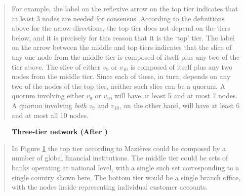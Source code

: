 \begin{center}
{{{{\begin{quote}
For example, the label on the reflexive arrow on the top tier indicates that at least 3 nodes are needed for consensus. According to the definitions above for the arrow directions, the top tier does not depend on the tiers below, and it is precisely for this reason that it is the `top' tier. The label on the arrow between the middle and top tiers indicates that the slice of any one node from the middle tier is composed of itself plus any two of the tier above. The slice of either $v_9$ or $v_{10}$ is composed of itself plus any two nodes from the middle tier. Since each of these, in turn, depends on any two of the nodes of the top tier, neither such slice can be a quorum. A quorum involving either $v_9$ or $v_{10}$ will have at least 5 and at most 7 nodes. A quorum involving \emph{both} $v_9$ and $v_{10}$, on the other hand, will have at least 6 and at most all 10 nodes.
\end{quote}
\vspace{-.5cm}
\begin{figure}[H]
\centering
\captionsetup{width=11cm}
\caption{\bf \small Three-tier network (After \cite{Mazieres2016})}
\label{fig:example2}
\end{figure}

\begin{quote}
In Figure \ref{fig:example2} the top tier according to Mazi\`eres could be composed by a number of global financial institutions. The middle tier could be sets of banks operating at national level, with a single such set corresponding to a single country shown here. The bottom tier would be a single branch office, with the nodes inside representing individual customer accounts.
\end{quote}

}}}}
\end{center}
